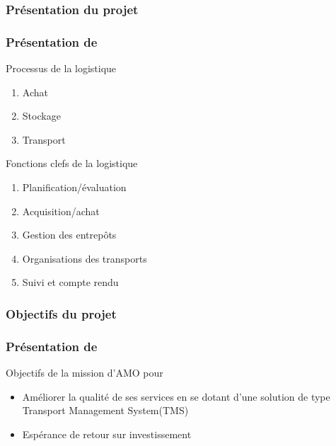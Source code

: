 \subsubsection{Présentation du projet}

\begin{frame}
\frametitle {Présentation de \mo} \pause
\begin{block}{Processus de la logistique} \pause
\begin{enumerate}
\item Achat \pause
\item Stockage \pause
\item Transport
\end{enumerate}
\end{block}

\begin{block}{Fonctions clefs de la logistique} \pause
\begin{enumerate}
\item Planification/évaluation \pause
\item Acquisition/achat \pause
\item Gestion des entrepôts \pause
\item Organisations des transports \pause
\item Suivi et compte rendu
\end{enumerate}
\end{block}
\end{frame}

\subsubsection{Objectifs du projet}

\begin{frame}
\frametitle {Présentation de \mo} 
\begin{block}{Objectifs de la mission d'AMO pour \mo}
\begin{itemize}
\item Améliorer la qualité de ses services en se dotant d'une solution de type Transport Management System(TMS) 
\item Espérance de retour sur investissement
\end{itemize}
\end{block}
\end{frame}


